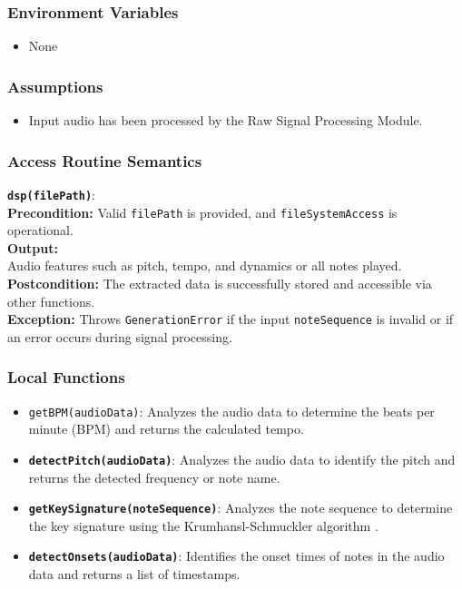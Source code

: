 \documentclass[12pt, titlepage]{article}
\begin{document}
\subsubsection{Environment Variables}  
\begin{itemize}  
    \item None  
\end{itemize}  

\subsubsection{Assumptions}  
\begin{itemize}  
    \item Input audio has been processed by the Raw Signal Processing Module.  
\end{itemize}  

\subsubsection{Access Routine Semantics}  
\noindent \textbf{\texttt{dsp(filePath)}}:\\
\textbf{Precondition:} Valid \texttt{filePath} is provided, and \texttt{fileSystemAccess} is operational. \\
\textbf{Output:}  \\ Audio features such as pitch, tempo, and dynamics or all notes played.
\textbf{Postcondition:} The extracted data is successfully stored and accessible via other functions. \\
\textbf{Exception:} Throws \texttt{GenerationError} if the input \texttt{noteSequence} is invalid or if an error occurs during signal processing.

\subsubsection{Local Functions}  
\begin{itemize}  
    \item \texttt{\texttt{getBPM(audioData)}}: Analyzes the audio data to determine the beats per minute (BPM) and returns the calculated tempo.
    \item \textbf{\texttt{detectPitch(audioData)}}: Analyzes the audio data to identify the pitch and returns the detected frequency or note name.
    \item \textbf{\texttt{getKeySignature(noteSequence)}}: Analyzes the note sequence to determine the key signature using the Krumhansl-Schmuckler algorithm \cite{krumhansl-schmuckler}.
    \item \textbf{\texttt{detectOnsets(audioData)}}: Identifies the onset times of notes in the audio data and returns a list of timestamps.
    
\end{itemize}  
\end{document}
